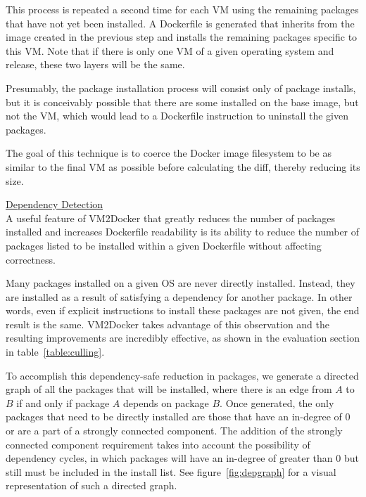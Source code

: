 This process is repeated a second time for each VM using the remaining packages that have not yet been installed. A Dockerfile is generated that inherits from the image created in the previous step and installs the remaining packages specific to this VM. Note that if there is only one VM of a given operating system and release, these two layers will be the same.

Presumably, the package installation process will consist only of package installs, but it is conceivably possible that there are some installed on the base image, but not the VM, which would lead to a Dockerfile instruction to uninstall the given packages.

The goal of this technique is to coerce the Docker image filesystem to be as similar to the final VM as possible before calculating the diff, thereby reducing its size.

\underline{Dependency Detection}\\
A useful feature of VM2Docker that greatly reduces the number of packages installed and increases Dockerfile readability is its ability to reduce the number of packages listed to be installed within a given Dockerfile without affecting correctness.

Many packages installed on a given OS are never directly installed. Instead, they are installed as a result of satisfying a dependency for another package. In other words, even if explicit instructions to install these packages are not given, the end result is the same. VM2Docker takes advantage of this observation and the resulting improvements are incredibly effective, as shown in the evaluation section in table~\ref{table:culling}.

To accomplish this dependency-safe reduction in packages, we generate a directed graph of all the packages that will be installed, where there is an edge from $A$ to $B$ if and only if package $A$ depends on package $B$. Once generated, the only packages that need to be directly installed are those that have an in-degree of 0 or are a part of a strongly connected component. The addition of the strongly connected component requirement takes into account the possibility of dependency cycles, in which packages will have an in-degree of greater than 0 but still must be included in the install list. See figure~\ref{fig:depgraph} for a visual representation of such a directed graph.


